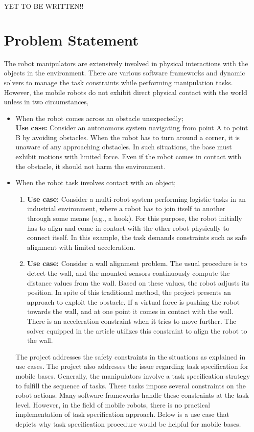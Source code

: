 YET TO BE WRITTEN!!



\section{Problem Statement}

The robot manipulators are extensively involved in physical interactions with the objects in the environment. There are various software frameworks and dynamic solvers to manage the task constraints while performing manipulation tasks. However, the mobile robots do not exhibit direct physical contact with the world unless in two circumstances,

\begin{itemize}
	\item When the robot comes across an obstacle unexpectedly; \\ \textbf{Use case:} Consider an autonomous system navigating from point A to point B by avoiding obstacles. When the robot has to turn around a corner, it is unaware of any approaching obstacles. In such situations, the base must exhibit motions with limited force. Even if the robot comes in contact with the obstacle, it should not harm the environment.
	\item When the robot task involves contact with an object; \begin{enumerate}
		\item \textbf{Use case:} Consider a multi-robot system performing logistic tasks in an industrial environment, where a robot has to join itself to another through some means (e.g., a hook). For this purpose, the robot initially has to align and come in contact with the other robot physically to connect itself. In this example, the task demands constraints such as safe alignment with limited acceleration.
		\item \textbf{Use case:} Consider a wall alignment problem. The usual procedure is to detect the wall, and the mounted sensors continuously compute the distance values from the wall. Based on these values, the robot adjusts its position. In spite of this traditional method, the project presents an approach to exploit the obstacle. If a virtual force is pushing the robot towards the wall, and at one point it comes in contact with the wall. There is an acceleration constraint when it tries to move further. The solver equipped in the article utilizes this constraint to align the robot to the wall.
	\end{enumerate}
	The project addresses the safety constraints in the situations as explained in use cases. The project also addresses the issue regarding task specification for mobile bases. Generally, the manipulators involve a task specification strategy to fulfill the sequence of tasks. These tasks impose several constraints on the robot actions. Many software frameworks handle these constraints at the task level. However, in the field of mobile robots, there is no practical implementation of task specification approach. Below is a use case that depicts why task specification procedure would be helpful for mobile bases. 

\end{itemize}
